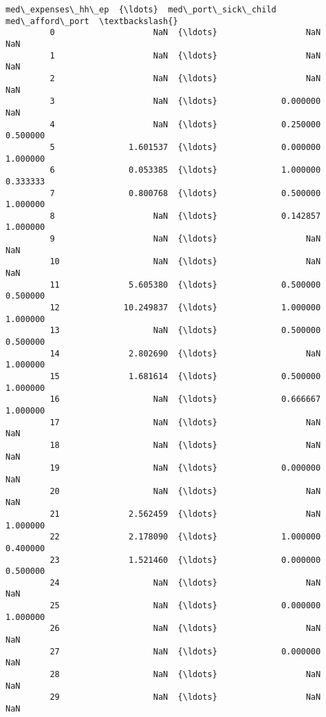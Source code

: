 \documentclass[11pt]{article}
\begin{document}
\begin{Verbatim}[commandchars=\\\{\}]
               med\_expenses\_hh\_ep  {\ldots}  med\_port\_sick\_child  med\_afford\_port  \textbackslash{}
         0                    NaN  {\ldots}                  NaN              NaN   
         1                    NaN  {\ldots}                  NaN              NaN   
         2                    NaN  {\ldots}                  NaN              NaN   
         3                    NaN  {\ldots}             0.000000              NaN   
         4                    NaN  {\ldots}             0.250000         0.500000   
         5               1.601537  {\ldots}             0.000000         1.000000   
         6               0.053385  {\ldots}             1.000000         0.333333   
         7               0.800768  {\ldots}             0.500000         1.000000   
         8                    NaN  {\ldots}             0.142857         1.000000   
         9                    NaN  {\ldots}                  NaN              NaN   
         10                   NaN  {\ldots}                  NaN              NaN   
         11              5.605380  {\ldots}             0.500000         0.500000   
         12             10.249837  {\ldots}             1.000000         1.000000   
         13                   NaN  {\ldots}             0.500000         0.500000   
         14              2.802690  {\ldots}                  NaN         1.000000   
         15              1.681614  {\ldots}             0.500000         1.000000   
         16                   NaN  {\ldots}             0.666667         1.000000   
         17                   NaN  {\ldots}                  NaN              NaN   
         18                   NaN  {\ldots}                  NaN              NaN   
         19                   NaN  {\ldots}             0.000000              NaN   
         20                   NaN  {\ldots}                  NaN              NaN   
         21              2.562459  {\ldots}                  NaN         1.000000   
         22              2.178090  {\ldots}             1.000000         0.400000   
         23              1.521460  {\ldots}             0.000000         0.500000   
         24                   NaN  {\ldots}                  NaN              NaN   
         25                   NaN  {\ldots}             0.000000         1.000000   
         26                   NaN  {\ldots}                  NaN              NaN   
         27                   NaN  {\ldots}             0.000000              NaN   
         28                   NaN  {\ldots}                  NaN              NaN   
         29                   NaN  {\ldots}                  NaN              NaN   

\end{Verbatim}
\end{document}
